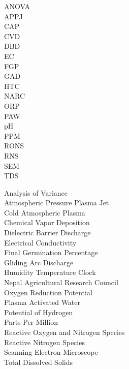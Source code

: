 \begin{minipage}{0.10\textwidth}
    \sloppy
    ANOVA\\
    APPJ\\
    CAP\\
    CVD\\
    DBD\\
    EC \\
    FGP \\
    GAD \\
    HTC \\
    NARC \\
    ORP \\
    PAW \\
    pH \\
    PPM\\
    RONS \\
    RNS \\
    SEM \\
    TDS \\
    
\end{minipage}
\hfill
\begin{minipage}{0.85\textwidth}
    \sloppy
    Analysis of Variance \\
    Atmospheric Pressure Plasma Jet \\
    Cold Atmospheric Plasma \\
    Chemical Vapor Deposition \\
    Dielectric Barrier Discharge\\
    Electrical Conductivity \\
    Final Germination Percentage \\
    Gliding Arc Discharge \\
    Humidity Temperature Clock \\
    Nepal Agricultural Research Council \\
    Oxygen Reduction Potential \\
    Plasma Activated Water\\
    Potential of Hydrogen \\
    Parts Per Million \\
    Reactive Oxygen and Nitrogen Species \\
    Reactive Nitrogen Species \\
    Scanning Electron Microscope \\
    Total Dissolved Solids \\
\end{minipage}

